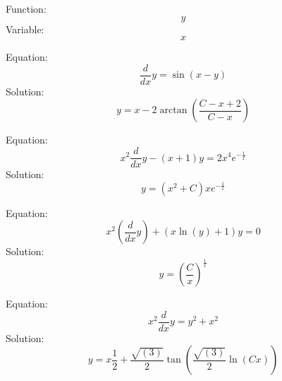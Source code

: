 \documentclass{article}
\begin{document}
Function:
$$
y
$$
Variable:
$$
x
$$


Equation:
$$
\frac{d}{dx}y=\sin(x-y)
$$
Solution:
$$
y=x-2 \arctan(\frac{C-x+2}{C-x})
$$

Equation:
$$
x^2 \frac{d}{dx}y-(x+1)y=2x^4 e^{-\frac{1}{x}}
$$
Solution:
$$
y=(x^2+C)xe^{-\frac{1}{x}}
$$

Equation:
$$
x^2 (\frac{d}{dx}y)+(x\ln(y)+1)y=0
$$
Solution:
$$
y=(\frac{C}{x})^{\frac{1}{x}}
$$

Equation:
$$
x^2 \frac{d}{dx}y=y^2+x^2
$$
Solution:
$$
y=x \frac{1}{2}+\frac{\sqrt{(3)}}{2}\tan(\frac{\sqrt{(3)}}{2}\ln(Cx))
$$
\end{document}
